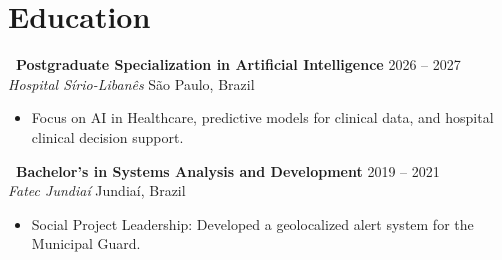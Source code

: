 \documentclass[10pt,a4paper]{article}
\begin{document}
\section{Education}

\noindent\textbf{\textbullet~Postgraduate Specialization in Artificial Intelligence} \hfill 2026 -- 2027 \\
\textit{Hospital Sírio-Libanês} \hfill São Paulo, Brazil
\begin{itemize}[leftmargin=*,label=\textendash,itemsep=2pt,parsep=0pt,topsep=2pt]
  \item Focus on AI in Healthcare, predictive models for clinical data, and hospital clinical decision support.
\end{itemize}

\vspace{4pt}

\noindent\textbf{\textbullet~Bachelor's in Systems Analysis and Development} \hfill 2019 -- 2021 \\
\textit{Fatec Jundiaí} \hfill Jundiaí, Brazil
\begin{itemize}[leftmargin=*,label=\textendash,itemsep=2pt,parsep=0pt,topsep=2pt]
  \item Social Project Leadership: Developed a geolocalized alert system for the Municipal Guard.
\end{itemize}
\end{document}
